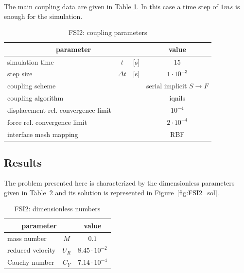 The main coupling data are given in Table \ref{table:FSI2-coupling}. In this case a time step of $1ms$ is enough for the simulation.

\begin{table}[!htb]
	\begin{center}
		\begin{tabular}{ l c  l| c } 
			\multicolumn{3}{c|}{parameter} & value   \\ 
			\hline
			simulation time  & $t$& [\si{s}] & 15      \\
			step size & $\Delta t$ & [\si{s}] & $1 \cdot 10^{-3}$   \\
			\hline
			coupling scheme & & & serial implicit  $S\rightarrow F$  \\
			coupling algorithm & & &  \acrshort{iqnils}  \\
			displacement rel. convergence limit & & & $10^{-4}$ \\
			force rel. convergence limit &&  & $2 \cdot 10^{-4}$  \\
      		interface mesh mapping & & & RBF  \\
			
		\end{tabular}
	\end{center}
	\caption{FSI2: coupling parameters}
	\label{table:FSI2-coupling}
\end{table}


\subsection{Results}

The problem presented here is characterized by the dimensionless parameters given in Table~\ref{table:FSI2-adim} and its solution is represented in Figure~\ref{fig:FSI2_sol}.

\begin{table}[!htb]
	\begin{center}
		\begin{tabular}{ l c | c } 
			\multicolumn{2}{c|}{parameter} & value   \\ 
			\hline
			mass number  & $M$ & $0.1$     \\
			reduced velocity & $U_R$ & $ 8.45\cdot 10^{-2}$  \\
			Cauchy number  & $C_Y$ & $  7.14 \cdot 10^{-4}$  \\			
		\end{tabular}
	\end{center}
	\caption{FSI2: dimensionless numbers}
	\label{table:FSI2-adim}
\end{table}

